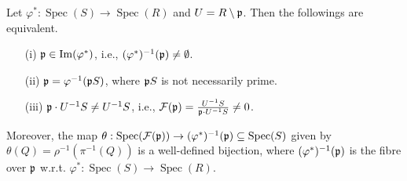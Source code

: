 \begin{theorem}
    Let $\varphi^*: \operatorname{Spec}(S) \to \operatorname{Spec}(R)$ and $U = R \setminus \mathfrak{p}$. Then the followings are equivalent.
    \begin{enumerate}
        \item[(i)] $\mathfrak{p} \in \operatorname{Im}(\varphi^*)$, i.e., $(\varphi^*)^{-1}(\mathfrak{p}) \neq \emptyset$.
        \item[(ii)] $\mathfrak{p} = \varphi^{-1}(\mathfrak{p} S)$, where $\mathfrak{p} S$ is not necessarily prime.
        \item[(iii)] $\mathfrak{p} \cdot U^{-1}S \neq U^{-1}S$, i.e., $\mathcal{F}(\mathfrak{p}) = \frac{U^{-1}S}{\mathfrak{p} \cdot U^{-1}S} \neq 0$.
    \end{enumerate}
    Moreover, the map $\theta: \operatorname{Spec}(\mathcal{F}(\mathfrak{p})) \to (\varphi^*)^{-1}(\mathfrak{p}) \subseteq \operatorname{Spec}(S)$ given by $\theta(Q) = \rho^{-1}(\pi^{-1}(Q))$ is a well-defined bijection, where $(\varphi^{*})^{-1}(\mathfrak{p})$ is the fibre over $\mathfrak{p}$ w.r.t. $\varphi^{*}: \operatorname{Spec}(S) \to \operatorname{Spec}(R)$.
    \begin{center}
    \end{center}

\end{theorem}

